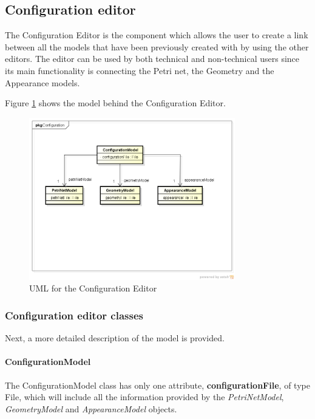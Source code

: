 \subsection{Configuration editor}

The Configuration Editor is the component which allows the user to create a link between all the models that have been previously created with by using the other editors. The editor can be used by both technical and non-technical users since its main functionality is connecting the Petri net, the Geometry and the Appearance models. 

Figure \ref{fig:uml-configuration-editor} shows the model behind the Configuration Editor. 

\begin{figure}[htp]
\begin{center}
  \includegraphics[width=0.8\textwidth]{image/configuration-model.png}
  \caption{UML for the Configuration Editor}
  \label{fig:uml-configuration-editor}
\end{center}
\end{figure}

\subsubsection{Configuration editor classes}

Next, a more detailed description of the model is provided.

\paragraph{ConfigurationModel}

The ConfigurationModel class has only one attribute, \textbf{configurationFile}, of type File, which will include all the information provided by the \textit{PetriNetModel}, \textit{GeometryModel} and \textit{AppearanceModel} objects. 

